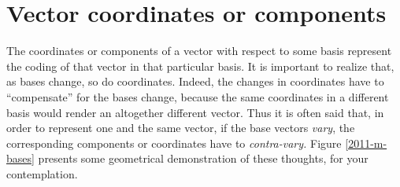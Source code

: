 \section{Vector coordinates or components}
The coordinates or components of a vector with respect to some basis
represent the coding of that vector in that particular basis.
It is important to realize that, as bases change, so do coordinates.
Indeed, the changes in coordinates have to ``compensate'' for the bases change,
because the same coordinates in a different basis would render an altogether different
vector.
Thus it is often said that, in order to represent one and the same vector,
if the base vectors {\em vary}, the corresponding components or coordinates have to {\em contra-vary.}
Figure \ref{2011-m-bases} presents some geometrical demonstration of
these thoughts, for your contemplation.

